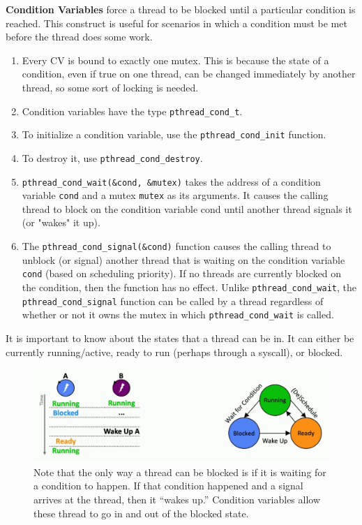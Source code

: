 \documentclass{article}
\begin{document}
    \begin{definition}
      \textbf{Condition Variables} force a thread to be blocked until a particular condition is reached. This construct is useful for scenarios in which a condition must be met before the thread does some work.
      \begin{enumerate}
        \item Every CV is bound to exactly one mutex. This is because the state of a condition, even if true on one thread, can be changed immediately by another thread, so some sort of locking is needed. 
        \item Condition variables have the type \texttt{pthread\_cond\_t}. 
        \item To initialize a condition variable, use the \texttt{pthread\_cond\_init} function. 
        \item To destroy it, use \texttt{pthread\_cond\_destroy}. 
        \item \texttt{pthread\_cond\_wait(\&cond, \&mutex)} takes the address of a condition variable \texttt{cond} and a mutex \texttt{mutex} as its arguments. It causes the calling thread to block on the condition variable cond until another thread signals it (or "wakes" it up).
        \item The \texttt{pthread\_cond\_signal(\&cond)} function causes the calling thread to unblock (or signal) another thread that is waiting on the condition variable \texttt{cond} (based on scheduling priority). If no threads are currently blocked on the condition, then the function has no effect. Unlike \texttt{pthread\_cond\_wait}, the \texttt{pthread\_cond\_signal} function can be called by a thread regardless of whether or not it owns the mutex in which \texttt{pthread\_cond\_wait} is called.
      \end{enumerate}
    \end{definition}

    It is important to know about the states that a thread can be in. It can either be currently running/active, ready to run (perhaps through a syscall), or blocked. 
    \begin{figure}[H]
      \centering 
      \includegraphics[scale=0.4]{img/states.png}
      \caption{Note that the only way a thread can be blocked is if it is waiting for a condition to happen. If that condition happened and a signal arrives at the thread, then it ``wakes up.'' Condition variables allow these thread to go in and out of the blocked state.} 
      \label{fig:states}
    \end{figure}
\end{document}
